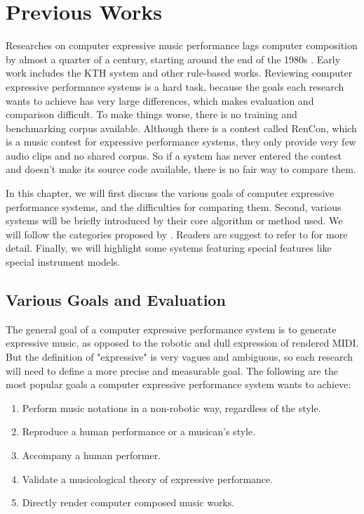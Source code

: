 \chapter{Previous Works}
\label{chap:prev}
Researches on computer expressive music performance lags computer composition by almost a quarter of a century, starting around the end of the 1980s \cite{THEBOOK}. Early work includes the KTH system \cite{THEBOOK} and other rule-based works. Reviewing computer expressive performance systems is a hard task, because the goals each research wants to achieve has very large differences, which makes evaluation and comparison difficult. To make things worse, there is no training and benchmarking corpus available. Although there is a contest called RenCon\cite{RenCon}, which is a music contest for expressive performance systems, they only provide very few audio clips and no shared corpus. So if a system has never entered the contest and doesn't make its source code available, there is no fair way to compare them.

In this chapter, we will first discuss the various goals of computer expressive performance systems, and the difficulties for comparing them.  Second, various systems will be briefly introduced by their core algorithm or method used. We will follow the categories proposed by \cite{THEBOOK}. Readers are suggest to refer to \cite{THEBOOK} for more detail. Finally, we will highlight some systems featuring special features like special instrument models.

\section{Various Goals and Evaluation}
The general goal of a computer expressive performance system is to generate expressive music, as opposed to the robotic and dull expression of rendered MIDI. But the definition of "expressive" is very vagues and ambiguous, so each research will need to define a more precise and measurable goal. The following are the most popular goals a computer expressive performance system wants to achieve:
\begin{enumerate}
   \item Perform music notations in a non-robotic way, regardless of the style.
   \item Reproduce a human performance or a musican's style.
   \item Accompany a human performer.
   \item Validate a musicological theory of expressive performance.
   \item Directly render computer composed music works.
\end{enumerate}

